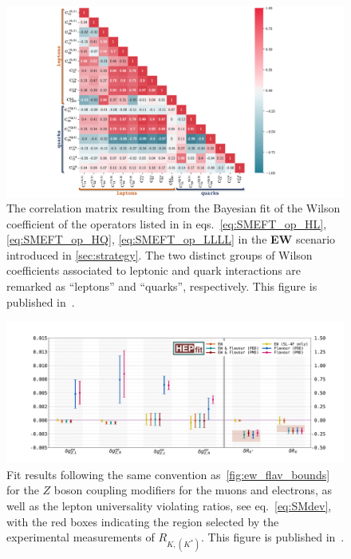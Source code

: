 \FloatBarrier
\begin{figure}[ht!]
	\centering
	\includegraphics[width=\textwidth]{figures/heatmap_EW_loop.pdf}
	\caption{ The correlation matrix resulting from the Bayesian fit of the Wilson coefficient of the operators listed in in eqs.~\eqref{eq:SMEFT_op_HL}, \eqref{eq:SMEFT_op_HQ}, \eqref{eq:SMEFT_op_LLLL} in the \textbf{EW} scenario introduced in \autoref{sec:strategy}. The two distinct groups of Wilson coefficients associated to leptonic and quark interactions are remarked as ``leptons'' and ``quarks'', respectively. This figure is published in~\cite{Alasfar:2020mne}. }
	\label{fig:ew_corr}
\end{figure}
\begin{figure}[htp!]
	\centering
	\includegraphics[width=\textwidth]{figures/errorbar_dg.pdf}
	\caption{ Fit results following the same convention as~\autoref{fig:ew_flav_bounds} for the $Z$ boson coupling modifiers for the muons and electrons, as well as the  lepton universality violating ratios, see eq.~\eqref{eq:SMdev}, with the red boxes indicating the region selected by the experimental measurements of $R_{K,(K^*)}$. This figure is published in~\cite{Alasfar:2020mne}. 
	}
	\label{fig:ew_flav_dg}
\end{figure}

